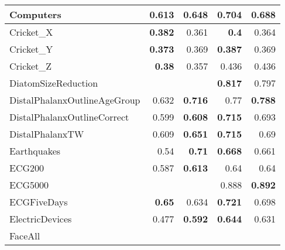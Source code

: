 \begin{longtable}{|l||r|r||r|r|}
\hline
Computers &
0.613 &
\cellcolor[rgb]{ .973,  .796,  .678} \textbf{0.648} &
\cellcolor[rgb]{ .973,  .796,  .678} \textbf{0.704} &
0.688
\bigstrut\\
\hline
\rowcolor[rgb]{ .851,  .851,  .851} Cricket\_X &
\cellcolor[rgb]{ .973,  .796,  .678} \textbf{0.382} &
0.361 &
\cellcolor[rgb]{ .973,  .796,  .678} \textbf{0.4} &
0.364
\bigstrut\\
\hline
Cricket\_Y &
\cellcolor[rgb]{ .973,  .796,  .678} \textbf{0.373} &
0.369 &
\cellcolor[rgb]{ .973,  .796,  .678} \textbf{0.387} &
0.369
\bigstrut\\
\hline
\rowcolor[rgb]{ .851,  .851,  .851} Cricket\_Z &
\cellcolor[rgb]{ .973,  .796,  .678} \textbf{0.38} &
0.357 &
0.436 &
0.436
\bigstrut\\
\hline
DiatomSizeReduction &
&
&
\cellcolor[rgb]{ .973,  .796,  .678} \textbf{0.817} &
0.797
\bigstrut\\
\hline
\rowcolor[rgb]{ .851,  .851,  .851} DistalPhalanxOutlineAgeGroup &
0.632 &
\cellcolor[rgb]{ .973,  .796,  .678} \textbf{0.716} &
0.77 &
\cellcolor[rgb]{ .973,  .796,  .678} \textbf{0.788}
\bigstrut\\
\hline
DistalPhalanxOutlineCorrect &
0.599 &
\cellcolor[rgb]{ .973,  .796,  .678} \textbf{0.608} &
\cellcolor[rgb]{ .973,  .796,  .678} \textbf{0.715} &
0.693
\bigstrut\\
\hline
\rowcolor[rgb]{ .851,  .851,  .851} DistalPhalanxTW &
0.609 &
\cellcolor[rgb]{ .973,  .796,  .678} \textbf{0.651} &
\cellcolor[rgb]{ .973,  .796,  .678} \textbf{0.715} &
0.69
\bigstrut\\
\hline
Earthquakes &
0.54 &
\cellcolor[rgb]{ .973,  .796,  .678} \textbf{0.71} &
\cellcolor[rgb]{ .973,  .796,  .678} \textbf{0.668} &
0.661
\bigstrut\\
\hline
\rowcolor[rgb]{ .851,  .851,  .851} ECG200 &
0.587 &
\cellcolor[rgb]{ .973,  .796,  .678} \textbf{0.613} &
0.64 &
0.64
\bigstrut\\
\hline
ECG5000 &
&
&
0.888 &
\cellcolor[rgb]{ .973,  .796,  .678} \textbf{0.892}
\bigstrut\\
\hline
\rowcolor[rgb]{ .851,  .851,  .851} ECGFiveDays &
\cellcolor[rgb]{ .973,  .796,  .678} \textbf{0.65} &
0.634 &
\cellcolor[rgb]{ .973,  .796,  .678} \textbf{0.721} &
0.698
\bigstrut\\
\hline
ElectricDevices &
0.477 &
\cellcolor[rgb]{ .973,  .796,  .678} \textbf{0.592} &
\cellcolor[rgb]{ .973,  .796,  .678} \textbf{0.644} &
0.631
\bigstrut\\
\hline
\rowcolor[rgb]{ .851,  .851,  .851} FaceAll &

\end{longtable}

